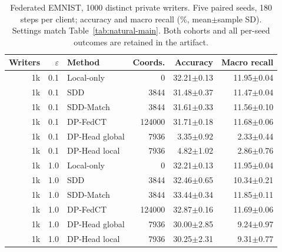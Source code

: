 \begin{table}[t]
\caption{Federated EMNIST, 1000 distinct private writers. Five paired seeds, 180 steps per client; accuracy and macro recall (\%, mean$\pm$sample SD). Settings match Table~\ref{tab:natural-main}. Both cohorts and all per-seed outcomes are retained in the artifact.}
\label{tab:natural-1k}\small
\centering
\begin{tabular}{@{}rrlrrr@{}}\toprule
Writers & $\varepsilon$ & Method & Coords. & Accuracy & Macro recall \\
\midrule
1k & 0.1 & Local-only & 0 & 32.21$\pm$0.13 & 11.95$\pm$0.04 \\
1k & 0.1 & SDD & 3844 & 31.48$\pm$0.37 & 11.47$\pm$0.04 \\
1k & 0.1 & SDD-Match & 3844 & 31.61$\pm$0.33 & 11.56$\pm$0.10 \\
1k & 0.1 & DP-FedCT & 124000 & 31.71$\pm$0.18 & 11.68$\pm$0.06 \\
1k & 0.1 & DP-Head global & 7936 & 3.35$\pm$0.92 & 2.33$\pm$0.44 \\
1k & 0.1 & DP-Head local & 7936 & 4.82$\pm$1.02 & 2.86$\pm$0.76 \\
1k & 1.0 & Local-only & 0 & 32.21$\pm$0.13 & 11.95$\pm$0.04 \\
1k & 1.0 & SDD & 3844 & 32.46$\pm$0.65 & 10.34$\pm$0.21 \\
1k & 1.0 & SDD-Match & 3844 & 33.44$\pm$0.34 & 11.85$\pm$0.11 \\
1k & 1.0 & DP-FedCT & 124000 & 32.87$\pm$0.16 & 11.69$\pm$0.06 \\
1k & 1.0 & DP-Head global & 7936 & 30.00$\pm$2.85 & 9.24$\pm$0.97 \\
1k & 1.0 & DP-Head local & 7936 & 30.25$\pm$2.31 & 9.31$\pm$0.77 \\
\bottomrule\end{tabular}
\end{table}
